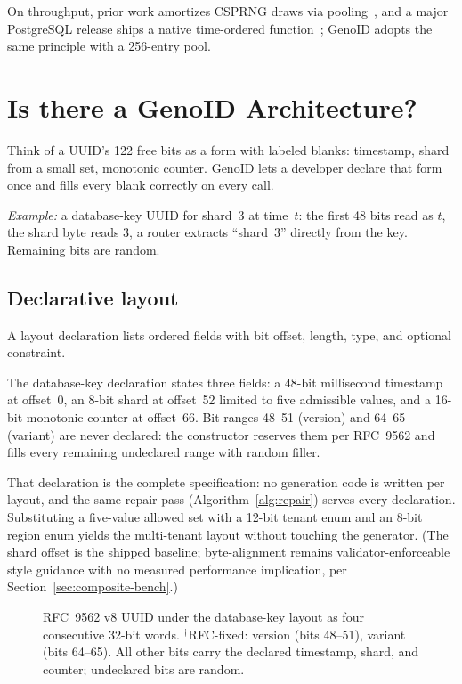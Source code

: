 \documentclass{svproc}
\begin{document}
On throughput, prior work amortizes CSPRNG draws via pooling~\cite{12}, and a major PostgreSQL release ships a native time-ordered function~\cite{13}; GenoID adopts the same principle with a 256-entry pool.

\section{Is there a GenoID Architecture?}
\label{sec:design}
Think of a UUID's 122 free bits as a form with labeled blanks: timestamp, shard from a small set, monotonic counter. GenoID lets a developer declare that form once and fills every blank correctly on every call.

\medskip
\noindent\emph{Example:} a database-key UUID for shard~3 at time~$t$: the first 48 bits read as $t$, the shard byte reads 3, a router extracts ``shard~3'' directly from the key. Remaining bits are random.

\subsection{Declarative layout}
\label{sec:layout}
A layout declaration lists ordered fields with bit offset, length, type, and optional constraint.

The database-key declaration states three fields: a 48-bit millisecond timestamp at offset~0, an 8-bit shard at offset~52 limited to five admissible values, and a 16-bit monotonic counter at offset~66. Bit ranges 48--51 (version) and 64--65 (variant) are never declared: the constructor reserves them per RFC~9562 and fills every remaining undeclared range with random filler.

That declaration is the complete specification: no generation code is written per layout, and the same repair pass (Algorithm~\ref{alg:repair}) serves every declaration. Substituting a five-value allowed set with a 12-bit tenant enum and an 8-bit region enum yields the multi-tenant layout without touching the generator. (The shard offset is the shipped baseline; byte-alignment remains validator-enforceable style guidance with no measured performance implication, per Section~\ref{sec:composite-bench}.)

\begin{figure}[!ht]
\centering
{}
\caption{RFC~9562 v8 UUID under the database-key layout as four consecutive
32-bit words. $^\dagger$RFC-fixed: version (bits 48--51), variant (bits 64--65). All other bits carry the declared timestamp, shard, and counter; undeclared bits are random.}
\label{fig:layout}
\end{figure}
\end{document}
